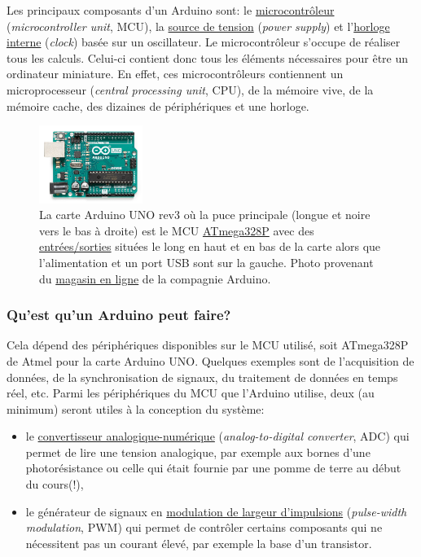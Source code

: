 \documentclass[english,french,12pt]{article}
\begin{document}
Les principaux composants d’un Arduino sont: le \href{https://en.wikipedia.org/wiki/Microcontroller}{microcontrôleur} (\textit{microcontroller unit}, MCU), la \href{https://electronics.stackexchange.com/questions/26484/how-arduino-power-supply-works}{source de tension} (\textit{power supply}) et l’\href{https://en.wikipedia.org/wiki/Clock_signal}{horloge interne} (\textit{clock}) basée sur un oscillateur. Le microcontrôleur s’occupe de réaliser tous les calculs. Celui-ci contient donc tous les éléments nécessaires pour être un ordinateur miniature. En effet, ces microcontrôleurs contiennent un microprocesseur (\textit{central processing unit}, CPU), de la mémoire vive, de la mémoire cache, des dizaines de périphériques et une horloge.

\begin{figure}[h]
    \centering
    \includegraphics[width=0.3\textwidth]{ArduinoUNO.jpg}
    \caption{La carte Arduino UNO rev3 où la puce principale (longue et noire vers le bas à droite) est le MCU \href{http://ww1.microchip.com/downloads/en/DeviceDoc/Atmel-7810-Automotive-Microcontrollers-ATmega328P_Datasheet.pdf}{ATmega328P} avec des \href{https://www.circuito.io/blog/arduino-uno-pinout/}{ entrées/sorties} situées le long en haut et en bas de la carte alors que l'alimentation et un port USB sont sur la gauche. Photo provenant du \href{https://store.arduino.cc/usa/}{magasin en ligne} de la compagnie Arduino.}
    \label{fig:ArduinoUNO}
\end{figure}

\subsubsection*{Qu'est qu'un Arduino peut faire?}
Cela dépend des périphériques disponibles sur le MCU utilisé, soit ATmega328P de Atmel pour la carte Arduino UNO. Quelques exemples sont de l’acquisition de données, de la synchronisation de signaux, du traitement de données en temps réel, etc. Parmi les périphériques du MCU que l’Arduino utilise, deux (au minimum) seront utiles à la conception du système:
\begin{itemize}
    \item le \href{https://en.wikipedia.org/wiki/Analog-to-digital_converter}{convertisseur analogique-numérique} (\textit{analog-to-digital converter}, ADC) qui permet de lire une tension analogique, par exemple aux bornes d’une photorésistance ou celle qui était fournie par une pomme de terre au début du cours(!),
    \item le générateur de signaux en   \href{https://en.wikipedia.org/wiki/Pulse-width_modulation}{modulation de largeur d'impulsions} (\textit{pulse-width modulation}, PWM) qui permet de contrôler certains composants qui ne nécessitent pas un courant élevé, par exemple la base d’un transistor.
\end{itemize}
\end{document}
